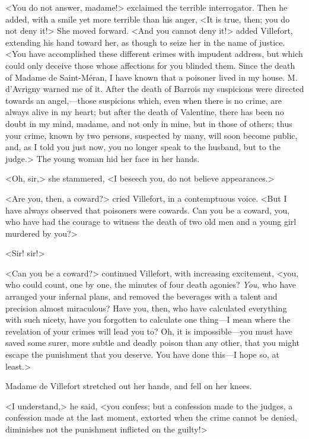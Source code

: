  <You do not answer, madame!> exclaimed the terrible interrogator. Then he added, with a smile yet more terrible than his anger, <It is true, then; you do not deny it!> She moved forward. <And you cannot deny it!> added Villefort, extending his hand toward her, as though to seize her in the name of justice. <You have accomplished these different crimes with impudent address, but which could only deceive those whose affections for you blinded them. Since the death of Madame de Saint-Méran, I have known that a poisoner lived in my house. M. d'Avrigny warned me of it. After the death of Barrois my suspicions were directed towards an angel,—those suspicions which, even when there is no crime, are always alive in my heart; but after the death of Valentine, there has been no doubt in my mind, madame, and not only in mine, but in those of others; thus your crime, known by two persons, suspected by many, will soon become public, and, as I told you just now, you no longer speak to the husband, but to the judge.>  The young woman hid her face in her hands. 

 <Oh, sir,> she stammered, <I beseech you, do not believe appearances.> 

 <Are you, then, a coward?> cried Villefort, in a contemptuous voice. <But I have always observed that poisoners were cowards. Can you be a coward, you, who have had the courage to witness the death of two old men and a young girl murdered by you?> 

 <Sir! sir!> 

 <Can you be a coward?> continued Villefort, with increasing excitement, <you, who could count, one by one, the minutes of four death agonies? \textit{You}, who have arranged your infernal plans, and removed the beverages with a talent and precision almost miraculous? Have you, then, who have calculated everything with such nicety, have you forgotten to calculate one thing—I mean where the revelation of your crimes will lead you to? Oh, it is impossible—you must have saved some surer, more subtle and deadly poison than any other, that you might escape the punishment that you deserve. You have done this—I hope so, at least.> 

 Madame de Villefort stretched out her hands, and fell on her knees. 

 <I understand,> he said, <you confess; but a confession made to the judges, a confession made at the last moment, extorted when the crime cannot be denied, diminishes not the punishment inflicted on the guilty!> 

